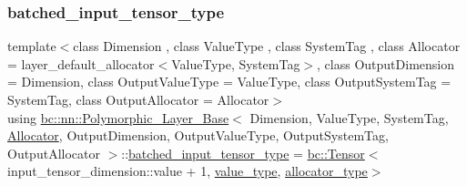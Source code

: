 \subsubsection{\texorpdfstring{batched\+\_\+input\+\_\+tensor\+\_\+type}{batched\_input\_tensor\_type}\hspace{0.1cm}{\footnotesize\ttfamily [2/2]}}
{\footnotesize\ttfamily template$<$class Dimension , class Value\+Type , class System\+Tag , class Allocator  = layer\+\_\+default\+\_\+allocator$<$\+Value\+Type, System\+Tag$>$, class Output\+Dimension  = Dimension, class Output\+Value\+Type  = Value\+Type, class Output\+System\+Tag  = System\+Tag, class Output\+Allocator  = Allocator$>$ \\
using \hyperlink{structbc_1_1nn_1_1Polymorphic__Layer__Base}{bc\+::nn\+::\+Polymorphic\+\_\+\+Layer\+\_\+\+Base}$<$ Dimension, Value\+Type, System\+Tag, \hyperlink{classbc_1_1allocators_1_1Allocator}{Allocator}, Output\+Dimension, Output\+Value\+Type, Output\+System\+Tag, Output\+Allocator $>$\+::\hyperlink{structbc_1_1nn_1_1Polymorphic__Layer__Base_ae694b03dd73923ff973b0d2c9156e161}{batched\+\_\+input\+\_\+tensor\+\_\+type} =  \hyperlink{namespacebc_a659391e47ab612be3ba6c18cf9c89159}{bc\+::\+Tensor}$<$input\+\_\+tensor\+\_\+dimension\+::value + 1, \hyperlink{structbc_1_1nn_1_1Polymorphic__Layer__Base_aa7d46845ee0a4544003a6f8fe3b7f52a}{value\+\_\+type}, \hyperlink{structbc_1_1nn_1_1Polymorphic__Layer__Base_a1414f8c37dea6254aebf63e4486ed818}{allocator\+\_\+type}$>$}

\mbox{\label{structbc_1_1nn_1_1Polymorphic__Layer__Base_a012247fd372f38d7156bda51bdd74a70}} 
